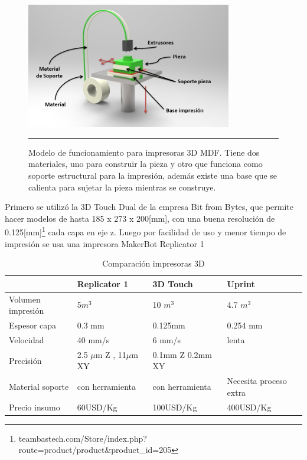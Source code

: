 \begin{figure}[htbp]
	\centering
		\includegraphics[width=0.8\textwidth]{./Figures/3Dprint.png}
		\rule{35em}{0.5pt}
	\caption[3Dprint]{Modelo de funcionamiento para impresoras 3D MDF. Tiene dos materiales, uno para construir la pieza y otro que funciona como soporte estructural para la impresión, además existe una base que se calienta para sujetar la pieza mientras se construye.}
	\label{fig:3Dprint}
\end{figure}	

Primero se utilizó la 3D Touch Dual de la empresa Bit from Bytes, que permite hacer modelos de hasta 185 x 273 x 200[mm], con una buena resolución de 0.125[mm]\footnote{teambastech.com/Store/index.php?route=product/product\&product\_id=205} cada capa en eje z. Luego por facilidad de uso y menor tiempo de impresión se usa una impresora MakerBot Replicator 1

\begin{table}\small 
    \begin{tabular}{l|lll}
    ~                     & Replicator 1                          & 3D Touch                   & Uprint      \\ \hline
    Volumen impresión         & 5$ m^{3} $                            & 10 $m^{3}$                 & 4.7 $m^{3}$ \\
    Espesor capa      & 0.3 mm                                & 0.125mm                    & 0.254 mm    \\
    Velocidad                 & 40 mm/s                               & 6 mm/s                     & lenta       \\
    Precisión & 2.5 $ \mu $m Z , 11$\mu$m XY  & 0.1mm Z  0.2mm XY  & ~           \\
    Material soporte  & con herramienta &con herramienta  & Necesita proceso extra      \\
    Precio insumo   &60USD/Kg	                          &           100USD/Kg         & 400USD/Kg        \\
    
    \end{tabular}
    \caption {Comparación impresoras 3D}
\end{table}

